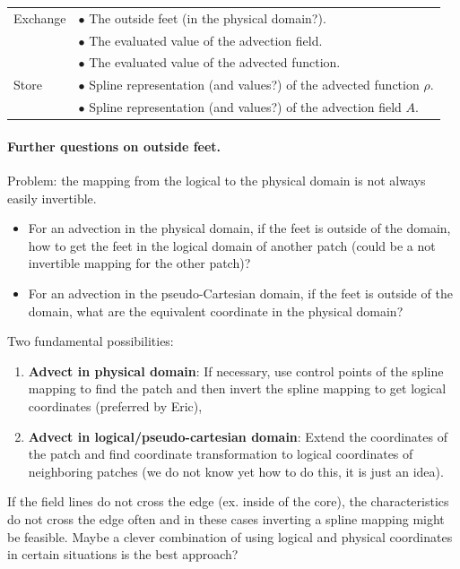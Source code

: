 \documentclass[presentation.tex]{subfiles}
\begin{document}
\begin{center}
\begin{tabular}{ |l|l| } 
 \hline
 Exchange 	&  $\bullet$ The outside feet (in the physical domain?). \\
 			&  $\bullet$ The evaluated value of the advection field. \\
 			&  $\bullet$ The evaluated value of the advected function. \\

 \hline
 Store 	& $\bullet$ Spline representation (and values?) of the advected function $\rho$. \\
 		& $\bullet$ Spline representation (and values?) of the advection field $A$. \\
 \hline
\end{tabular}
\end{center}

\paragraph{Further questions on outside feet.}
Problem: the mapping from the logical to the physical domain is not always easily invertible. 

\begin{itemize}
	\item For an advection in the physical domain, if the feet is outside of the domain, how to get the feet in the logical domain of another patch (could be a not invertible mapping for the other patch)?
	\item For an advection in the pseudo-Cartesian domain, if the feet is outside of the domain, what are the equivalent coordinate in the physical domain? 
\end{itemize}

Two fundamental possibilities:
\begin{enumerate}
	\item \textbf{Advect in physical domain}: If necessary, use control points of the spline mapping
			to find the patch and then invert the spline mapping to get logical coordinates
			(preferred by Eric),
	\item \textbf{Advect in logical/pseudo-cartesian domain}: Extend the coordinates of the patch
			and find coordinate transformation to logical coordinates of neighboring patches (we do not know yet how to do this, it is just an idea).
\end{enumerate}

If the field lines do not cross the edge (ex. inside of the core), the characteristics do not cross the edge often and 
in these cases inverting a spline mapping might be feasible. Maybe a clever combination of using logical and 
physical coordinates in certain situations is the best approach?
\end{document}

